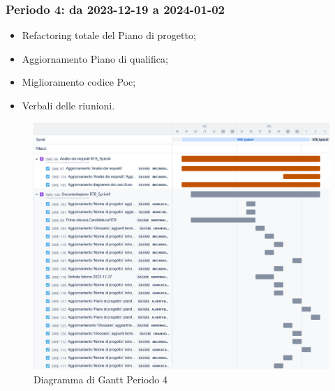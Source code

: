\documentclass[10pt, a4paper]{article}
\begin{document}
{{{{{{{{\subsubsection{Periodo 4: da 2023-12-19 a 2024-01-02}
\begin{itemize}
    \item Refactoring totale del Piano di progetto;
    \item Aggiornamento Piano di qualifica;
    \item Miglioramento codice Poc;
    \item Verbali delle riunioni.
\end{itemize}
\begin{figure}[H]
    \centering        
    \includegraphics[width=15.5cm]{gantt/ganttPeriodo4.png}
    \caption{Diagramma di Gantt Periodo 4}
\end{figure}

}}}}}}}}
\end{document}
